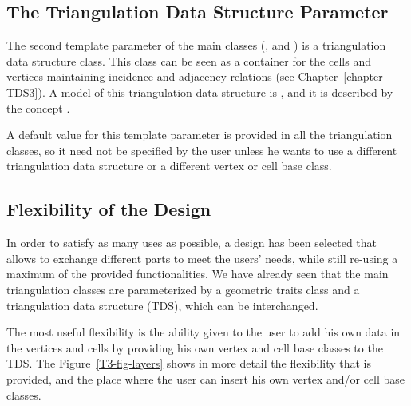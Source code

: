 \subsection{The Triangulation Data Structure Parameter}
\label{Triangulation3-sec-tds}

The second template parameter of the main classes (,
 and ) is a
triangulation data structure class.  This class can be seen as a container for
the cells and vertices maintaining incidence and adjacency relations (see
Chapter~\ref{chapter-TDS3}).  A model of this triangulation data structure is
,
and it is described by the  concept
.

A default value for this template parameter is provided in all the
triangulation classes, so it need not be specified by the user unless he wants
to use a different triangulation data structure or a different vertex or cell
base class.

\subsection{Flexibility of the Design}

In order to satisfy as many uses as possible, a design has been selected that
allows to exchange different parts to meet the users' needs, while still
re-using a maximum of the provided functionalities.  We have already seen that
the main triangulation classes are parameterized by a geometric traits class
and a triangulation data structure (TDS), which can be interchanged.

The most useful flexibility is the ability given to the user to add his own
data in the vertices and cells by providing his own vertex and cell base
classes to the TDS.  The Figure~\ref{T3-fig-layers} shows in more detail the
flexibility that is provided, and the place where the user can insert his own
vertex and/or cell base classes.

